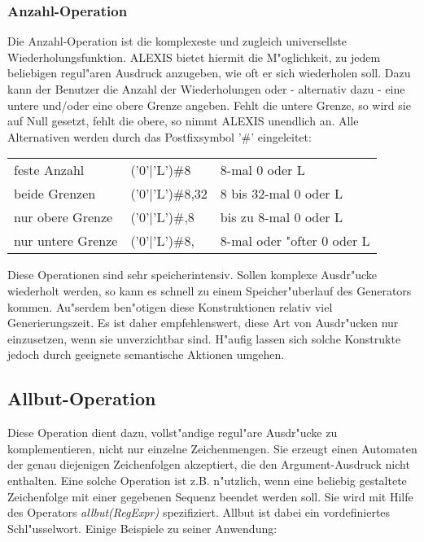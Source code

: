 \subsubsection{Anzahl-Operation}
Die Anzahl-Operation ist die komplexeste und zugleich universellste
Wiederholungsfunktion. ALEXIS bietet hiermit die M"oglichkeit, zu jedem beliebigen
regul"aren Ausdruck anzugeben, wie oft er sich wiederholen soll. Dazu kann der
Benutzer die Anzahl der Wiederholungen oder - alternativ dazu - eine untere und/oder
eine obere Grenze angeben. Fehlt die untere Grenze, so wird sie auf Null gesetzt, fehlt
die obere, so nimmt ALEXIS unendlich an. Alle Alternativen werden durch das
Postfixsymbol '\#' eingeleitet:

\medskip

\begin{tabular}{lll}
feste Anzahl&('0'$\mid$'L')\#8&8-mal 0 oder L\\
beide Grenzen&('0'$\mid$'L')\#8,32&8 bis 32-mal 0 oder L\\
nur obere Grenze&('0'$\mid$'L')\#,8&bis zu 8-mal 0 oder L\\
nur untere Grenze&('0'$\mid$'L')\#8,&8-mal oder "ofter 0 oder L\\
\end{tabular}

\medskip

Diese Operationen sind sehr speicherintensiv. Sollen komplexe Ausdr"ucke wiederholt
werden, so kann es schnell zu einem Speicher"uberlauf des Generators kommen. Au"serdem
ben"otigen diese Konstruktionen relativ viel Generierungszeit. Es ist daher
empfehlenswert, diese Art von Ausdr"ucken nur einzusetzen, wenn sie unverzichtbar
sind. H"aufig lassen sich solche Konstrukte jedoch durch geeignete semantische
Aktionen umgehen.
\subsection{Allbut-Operation}
Diese Operation dient dazu, vollst"andige regul"are Ausdr"ucke zu komplementieren,
nicht nur einzelne Zeichenmengen. Sie erzeugt einen Automaten der genau diejenigen
Zeichenfolgen akzeptiert, die den Argument-Ausdruck nicht enthalten. Eine solche
Operation ist z.B. n"utzlich, wenn eine beliebig gestaltete Zeichenfolge mit einer
gegebenen Sequenz beendet werden soll. Sie wird mit Hilfe des Operators
{\it allbut(RegExpr)\/} spezifiziert. Allbut ist dabei ein vordefiniertes
Schl"usselwort. Einige Beispiele zu seiner Anwendung:

\medskip

